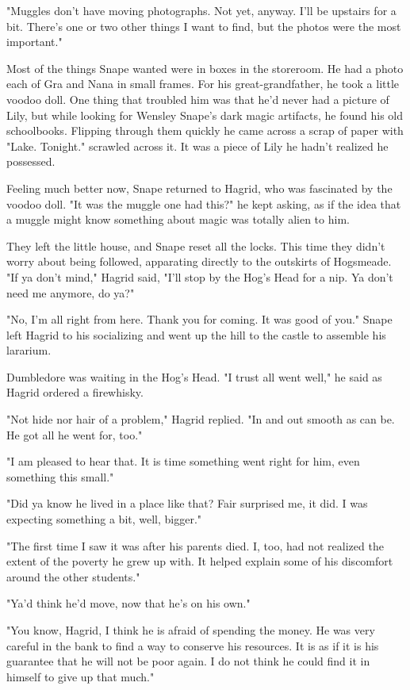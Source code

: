 \documentclass[a4paper,11pt]{article}
\begin{document}
"Muggles don't have moving photographs. Not yet, anyway. I'll be upstairs for a bit. There's one or two other things I want to find, but the photos were the most important."

Most of the things Snape wanted were in boxes in the storeroom. He had a photo each of Gra and Nana in small frames. For his great-grandfather, he took a little voodoo doll. One thing that troubled him was that he'd never had a picture of Lily, but while looking for Wensley Snape's dark magic artifacts, he found his old schoolbooks. Flipping through them quickly he came across a scrap of paper with "Lake. Tonight." scrawled across it. It was a piece of Lily he hadn't realized he possessed.

Feeling much better now, Snape returned to Hagrid, who was fascinated by the voodoo doll. "It was the muggle one had this?" he kept asking, as if the idea that a muggle might know something about magic was totally alien to him.

They left the little house, and Snape reset all the locks. This time they didn't worry about being followed, apparating directly to the outskirts of Hogsmeade. "If ya don't mind," Hagrid said, "I'll stop by the Hog's Head for a nip. Ya don't need me anymore, do ya?"

"No, I'm all right from here. Thank you for coming. It was good of you." Snape left Hagrid to his socializing and went up the hill to the castle to assemble his lararium.

Dumbledore was waiting in the Hog's Head. "I trust all went well," he said as Hagrid ordered a firewhisky.

"Not hide nor hair of a problem," Hagrid replied. "In and out smooth as can be. He got all he went for, too."

"I am pleased to hear that. It is time something went right for him, even something this small."

"Did ya know he lived in a place like that? Fair surprised me, it did. I was expecting something a bit, well, bigger."

"The first time I saw it was after his parents died. I, too, had not realized the extent of the poverty he grew up with. It helped explain some of his discomfort around the other students."

"Ya'd think he'd move, now that he's on his own."

"You know, Hagrid, I think he is afraid of spending the money. He was very careful in the bank to find a way to conserve his resources. It is as if it is his guarantee that he will not be poor again. I do not think he could find it in himself to give up that much."
\end{document}
